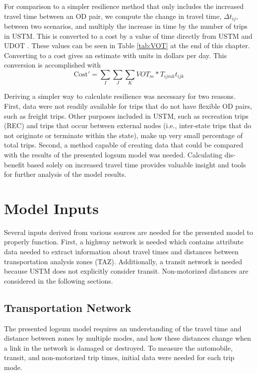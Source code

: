For comparison to a simpler resilience method that only includes the increased
travel time between an OD pair, we compute the change in travel
time, \(\Delta t_{ij}\), between two scenarios, and multiply the increase in
time by the number of trips in USTM. This is converted to a cost by a value of
time directly from USTM and UDOT \citep{UtahDepartmentofTransportation2020}. These
values can be seen in Table \ref{tab:VOT} at the end of this chapter. Converting to
a cost gives an estimate with units in
dollars per day. This conversion is accomplished with
\begin{equation}
\mathrm{Cost}' =  \sum_I \sum_J \sum_K VOT_{m} * T_{ijmk} t_{ijk}
  \label{eq:ttmethod}
\end{equation}

\noindent Deriving a simpler way to calculate resilience was necessary for two
reasons. First, data were not readily available for trips that do not have
flexible OD pairs, such as freight trips. Other purposes included in USTM,
such as recreation trips (REC) and trips that occur between external nodes
(i.e., inter-state trips that do not originate or terminate within the state),
make up very small percentage of total trips. Second, a method capable of
creating data that could be compared with the results of the presented logsum model
was needed. Calculating dis-benefit
based solely on increased travel time provides valuable insight and tools for
further analysis of the model results.

\section{Model Inputs}

Several inputs derived from various sources are needed for the presented model
to properly function. First, a highway network is needed which contains attribute
data needed to extract information about travel times and distances between
transportation analysis zones (TAZ). Additionally, a transit network is needed
because USTM does not explicitly consider transit. Non-motorized distances are
considered in the following sections.

\subsection{Transportation Network}

The presented logsum model requires an
understanding of the travel time and distance between zones by multiple modes, and how
these distances change when a link in the network is damaged or destroyed. To measure the
automobile, transit, and non-motorized trip times, initial data were needed for each trip mode.

